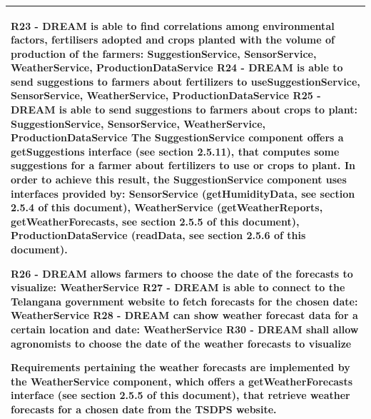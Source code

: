 \documentclass{article}
\begin{document}
\begin{longtable}[c]{|m{11.75cm}|}
    \textbf{R23 - DREAM is able to find correlations among environmental factors, fertilisers adopted and crops planted with the volume of production of the farmers: SuggestionService, SensorService, WeatherService, ProductionDataService
    \newline\newline
    R24 - DREAM is able to send suggestions to farmers about fertilizers to useSuggestionService, SensorService, WeatherService, ProductionDataService
    \newline\newline
    R25 - DREAM is able to send suggestions to farmers about crops to plant: SuggestionService, SensorService, WeatherService, ProductionDataService
    \newline\newline}
    The SuggestionService component offers a getSuggestions interface (see section 2.5.11), that computes some suggestions for a farmer about fertilizers to use or crops to plant. In order to achieve this result, the SuggestionService component uses interfaces provided by: SensorService (getHumidityData, see section 2.5.4 of this document), WeatherService (getWeatherReports, getWeatherForecasts, see section 2.5.5 of this document), ProductionDataService (readData, see section 2.5.6 of this document).
    \hline
    
    \textbf{R26 - DREAM allows farmers to choose the date of the forecasts to visualize: WeatherService
    \newline\newline
    R27 - DREAM is able to connect to the Telangana government website to fetch forecasts for the chosen date: WeatherService
    \newline\newline
    R28 - DREAM can show weather forecast data for a certain location and date: WeatherService
    \newline\newline
    R30 - DREAM shall allow agronomists to choose the date of the weather forecasts to visualize}
    \newline\newline
    
    Requirements pertaining the weather forecasts are implemented by the WeatherService component, which offers a getWeatherForecasts interface (see section 2.5.5 of this document), that retrieve weather forecasts for a chosen date from the TSDPS website.\\
    \hline
    

\end{longtable}
\end{document}
